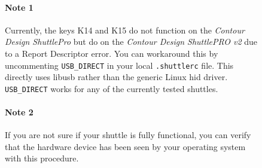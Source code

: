 \begin{figure}
\paragraph{Note 1} Currently, the keys K14 and K15 do not function on the \textit{Contour Design ShuttlePro} but do on the   \textit{Contour Design ShuttlePRO v2} due to a Report Descriptor error.  You can workaround this by uncommenting \texttt{USB\_DIRECT} in your local \texttt{.shuttlerc} file.  This directly uses libusb rather than the generic Linux hid driver.  \texttt{USB\_DIRECT} works for any of the currently tested shuttles. 
    
\paragraph{Note 2} If you are not sure if your shuttle is fully functional, you can verify that the hardware device has been seen by your operating system with this procedure.



\end{figure}
